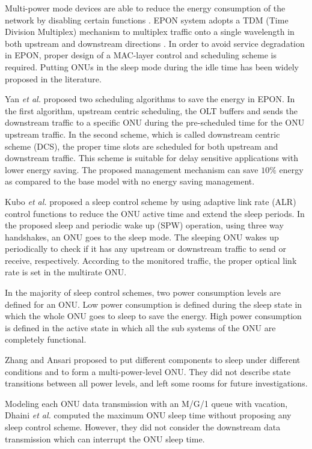 \documentclass[11pt,english,12pt,onecolumn, draftcls]{IEEEtran}
\theoremstyle{plain}
\theoremstyle{definition}
\begin{document}
Multi-power mode devices are able to reduce the energy consumption of the network by disabling certain functions \cite{Gupta2007}. EPON system adopts a TDM (Time Division Multiplex) mechanism to multiplex traffic onto a single wavelength in both upstream and downstream directions \cite{Luo2007}. In order to avoid service degradation in EPON, proper design of a MAC-layer control and scheduling scheme is required. Putting ONUs in the sleep mode during the idle time has been widely proposed in the literature.

Yan \emph{et al.} \cite{yan2010energy} proposed two scheduling algorithms to save the energy in EPON. In the first algorithm, upstream centric scheduling, the OLT buffers and sends the downstream traffic to a specific ONU during the pre-scheduled time for the ONU upstream traffic. In the second scheme, which is called downstream centric scheme (DCS), the proper time slots are scheduled for both upstream and downstream traffic. This scheme is suitable for delay sensitive applications with lower energy saving. The proposed management mechanism can save $10\%$ energy as compared to the base model with no energy saving management.

Kubo \emph{et al.} \cite{KubStu10} proposed a sleep control scheme by using adaptive link rate (ALR) control functions to reduce the ONU active time and extend the sleep periods. In the proposed sleep and periodic wake up (SPW) operation, using three way handshakes, an ONU goes to the sleep mode. The sleeping ONU wakes up periodically to check if it has any upstream or downstream traffic to send or receive, respectively. According to the monitored traffic,  the proper optical link rate is set in the multirate ONU.

In the majority of sleep control schemes, two power consumption levels are defined for an ONU. Low power consumption is defined during the sleep state in which the whole ONU goes to sleep to save the energy. High power consumption is defined in the active state in which all the sub systems of the ONU are completely functional.

Zhang and Ansari \cite{ZhaTow11} proposed to put different components to sleep under different conditions and to form a multi-power-level ONU. They did not describe state transitions between all power levels, and left some rooms for future investigations.

Modeling each ONU data transmission with an M/G/1 queue with vacation, Dhaini \emph{et al.} \cite{Dhaini11} computed the maximum ONU sleep time without proposing any sleep control scheme. However, they did not consider the downstream data transmission which can interrupt the ONU sleep time.
\end{document}
